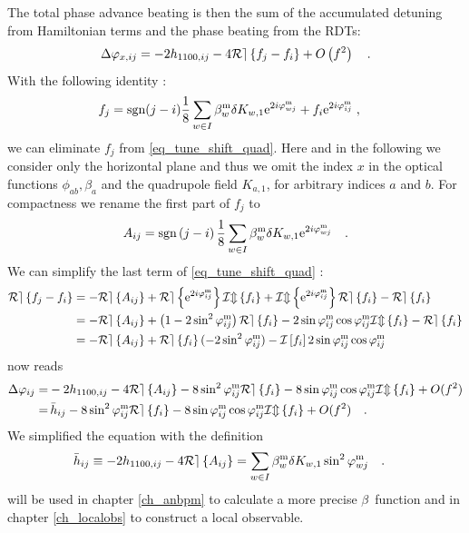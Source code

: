 The total phase advance beating is then the sum of the accumulated detuning from Ha\-mil\-to\-nian
terms and the phase beating from the RDTs:
%
\begin{equation}
  \Delta \varphi_{x,ij} = -2h_{1100,ij} - 4\mathcal{Re} \left\{ f_{j} - f_{i} \right\} + O \left( f^2 \right)
  \quad .
  \label{eq_tune_shift_quad}
\end{equation}
%
 With the following identity \cite{Tomas2005, Franchi2007}: 
%
\begin{align}
  f_j &= \text{sgn}(j-i) \frac{1}{8}\sum\limits_{w\in I}\beta_w ^\text{m} \delta K_{w,1}
  \text{e}^{2i\varphi_{wj}^\text{m}}+f_{i}\text{e}^{2i\varphi_{ij}^\text{m}}\; ,
  \label{eq_rogelio_fjfromfi} 
\end{align}
%
we can eliminate $f_j$ from \eqref{eq_tune_shift_quad}.
Here and in the following we consider only the horizontal plane and thus we omit the index $x$ in the optical
functions $\phi_{ab}, \beta_a$ and the quadrupole field $K_{a,1}$, for arbitrary indices $a$ and $b$.
For compactness we rename the first part of $f_j$ to
%
\begin{equation}
  A_{ij} = \text{sgn} \left( j-i \right) \frac{1}{8} \sum\limits_{w \in I} \beta_w^\text{m} \delta
  K_{w,1} \text{e}^{2i\varphi_{wj}^\text{m}}
  \quad .
  \label{eq_Aij}
\end{equation}
%
We can simplify the last term of \eqref{eq_tune_shift_quad} \cite{Franchi2014}:
%
\begin{align}
  \label{eq_simplify_Re(f)}
  \mathcal{Re} \left\{ f_j-f_i \right\} &= 
  -\mathcal{Re} \left\{ A_{ij} \right\} + \mathcal{Re} \left\{ \text{e}^{2i\varphi_{ij}^\text{m}} \right\}\mathcal{Im} \left\{ f_i \right\} + \mathcal{Im} \left\{ \text{e}^{2i\varphi_{ij}^\text{m}} \right\}\mathcal{Re} \left\{ f_i \right\} -
  \mathcal{Re} \left\{ f_i \right\} \notag \\ 
  &= -\mathcal{Re} \left\{ A_{ij} \right\} + \left( 1-2\sin^2\varphi_{ij}^\text{m} \right)\mathcal{Re} \left\{ f_i \right\} -
  2\sin\varphi_{ij}^\text{m} \cos\varphi_{ij}^\text{m} \mathcal{Im} \left\{ f_i \right\} - \mathcal{Re} \left\{ f_i \right\} \notag \\
  &= -\mathcal{Re} \left\{ A_{ij} \right\} + \mathcal{Re} \left\{ f_i \right\}(-2\sin^2\varphi_{ij}^\text{m}) - \mathcal{I}\left[f_i\right]2 \sin\varphi_{ij}^\text{m}\cos\varphi_{ij}^\text{m}
\end{align}
%
 now reads
%
\begin{align}
  \Delta\varphi_{ij} =& -2h_{1100,ij} - 4\mathcal{Re} \left\{ A_{ij} \right\} - 8 \sin^2\varphi_{ij}^\text{m}\mathcal{Re} \left\{ f_i \right\}
- 8\sin\varphi_{ij}^\text{m} \cos\varphi_{ij}^\text{m}\mathcal{Im} \left\{ f_i \right\}+O(f^2) \notag \\
=&\, \bar{h}_{ij} - 8 \sin^2\varphi_{ij}^\text{m}\mathcal{Re} \left\{ f_i \right\} - 8\sin\varphi_{ij}^\text{m} \cos\varphi_{ij}^\text{m}\mathcal{Im} \left\{ f_i \right\} 
 +O(f^2)
\quad .
\label{eq_phasebeating_1st_app}
\end{align}
%
We simplified the equation with the definition
%
\begin{align}
  \bar{h}_{ij} &\equiv -2h_{1100,ij} - 4\mathcal{Re} \left\{ A_{ij} \right\} 
= \sum\limits_{w \in I}\beta_w^\text{m} \delta K_{w,1}\sin ^ 2 \varphi_{wj}^\text{m}\quad .
\label{eq_hbar_app}
\end{align}
%
 will be used in chapter \ref{ch_anbpm} to calculate a more
precise $\beta$~function and in chapter \ref{ch_localobs} to construct a local observable.

